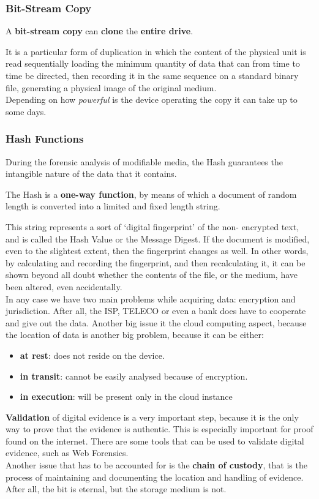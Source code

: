 \subsubsection{Bit-Stream Copy}
\begin{boxH}
  A \textbf{bit-stream copy} can \textbf{clone} the \textbf{entire
  drive}.
\end{boxH}
It is a particular form of duplication in which the content of the
physical unit is read sequentially loading the minimum quantity of
data that can from time to time be directed, then recording it in the
same sequence on a standard binary file, generating a physical image
of the original medium.\\
Depending on how \textit{powerful} is the device operating the copy it
can take up to some days.

\subsubsection{Hash Functions}
During the forensic analysis of modifiable media, the Hash 
guarantees the intangible nature of the data that it contains.
\begin{boxH}
  The Hash is a \textbf{one-way function}, by means of which a
  document of random length is converted into a limited and fixed
  length string.
\end{boxH}
This string represents a sort of ‘digital fingerprint’ of the non-
encrypted text, and is called the Hash Value or the Message Digest. If
the document is modified, even to the slightest extent, then the
fingerprint changes as well. In other words, by calculating and
recording the fingerprint, and then recalculating it, it can be shown
beyond all doubt whether the contents of the file, or the medium, have
been altered, even accidentally.\\

In any case we have two main problems while acquiring data: encryption
and jurisdiction. After all, the ISP, TELECO or even a bank does have
to cooperate and give out the data. Another big issue it the cloud
computing aspect, because the location of data is another big problem,
because it can be either:
\begin{itemize}
  \item \textbf{at rest}: does not reside on the device. 
  \item \textbf{in transit}: cannot be easily analysed because of
    encryption. 
  \item \textbf{in execution}: will be present only in the cloud
    instance
\end{itemize}
\textbf{Validation} of digital evidence is a very important step,
because it is the only way to prove that the evidence is authentic.
This is especially important for proof found on the internet. There
are some tools that can be used to validate digital evidence, such as
Web Forensics.\\
Another issue that has to be accounted for is the \textbf{chain of
custody}, that is the process of maintaining and documenting the
location and handling of evidence. After all, the bit is eternal, but
the storage medium is not.

